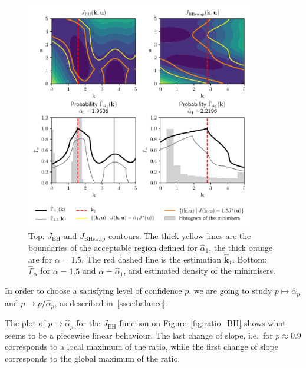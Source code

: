\documentclass[preprint, 1p]{elsarticle}
\newcommand{\Ex}{\mathbb{E}}
\newcommand{\hatkmean}{\hat{\mathbf{k}}_{\Ex}}
\newcommand{\hatkvar}{\hat{\mathbf{k}}_{\mathbb{V}}}
\newcommand{\checka}{{\alpha}}
\newcommand{\checkk}{\mathbf{k}}
\begin{document}
\begin{figure}[!ht]
  \centering
\includegraphics[width=10cm]{Figures/branin_side_66_relax_gamma_both.pdf}
\caption{Top: $J_{\mathrm{BH}}$ and $J_{\mathrm{BHswap}}$ contours. The thick yellow lines are the boundaries of the acceptable region defined for $\hat{\checka}_1$, the thick orange are for $\alpha=1.5$. The red dashed line is the estimation $\hat{\checkk}_1$. Bottom: $\hat{\Gamma}_{\alpha}$ for $\alpha = 1.5$ and $\alpha=\hat{\checka}_1$, and estimated density of the minimisers.}
\label{fig:contour_alpha}
\end{figure}


In order to choose a satisfying level of confidence $p$, we are going to study $p\mapsto \hat{\checka}_p$ and $p\mapsto p/\hat{\checka}_p$, as described in~\ref{ssec:balance}.

 The plot of $p\mapsto \hat{\checka}_p$ for the $J_{\mathrm{BH}}$ function on Figure~\ref{fig:ratio_BH} shows what seems to be a piecewise linear behaviour. The last change of slope, i.e.\ for $p\approx 0.9$ corresponds to a local maximum of the ratio, while the first change of slope corresponds to the global maximum of the ratio.
 
\end{document}
